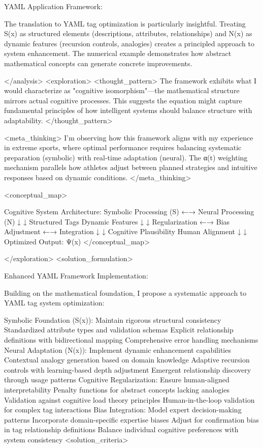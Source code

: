 {YAML Application Framework:

The translation to YAML tag optimization is particularly insightful. Treating S(x) as structured elements (descriptions, attributes, relationships) and N(x) as dynamic features (recursion controls, analogies) creates a principled approach to system enhancement. The numerical example demonstrates how abstract mathematical concepts can generate concrete improvements.

</analysis> <exploration>
<thought_pattern>
The framework exhibits what I would characterize as "cognitive isomorphism"—the mathematical structure mirrors actual cognitive processes. This suggests the equation might capture fundamental principles of how intelligent systems should balance structure with adaptability.
</thought_pattern>

<meta_thinking>
I'm observing how this framework aligns with my experience in extreme sports, where optimal performance requires balancing systematic preparation (symbolic) with real-time adaptation (neural). The α(t) weighting mechanism parallels how athletes adjust between planned strategies and intuitive responses based on dynamic conditions.
</meta_thinking>

<conceptual_map>

Cognitive System Architecture:
Symbolic Processing (S) ←→ Neural Processing (N)
        ↓                           ↓
   Structured Tags              Dynamic Features
        ↓                           ↓
    Regularization ←→ Bias Adjustment ←→ Integration
        ↓                           ↓
   Cognitive Plausibility      Human Alignment
        ↓                           ↓
     Optimized Output: Ψ(x)
</conceptual_map>

</exploration>
<solution_formulation>

Enhanced YAML Framework Implementation:

Building on the mathematical foundation, I propose a systematic approach to YAML tag system optimization:

Symbolic Foundation (S(x)): Maintain rigorous structural consistency
Standardized attribute types and validation schemas
Explicit relationship definitions with bidirectional mapping
Comprehensive error handling mechanisms
Neural Adaptation (N(x)): Implement dynamic enhancement capabilities
Contextual analogy generation based on domain knowledge
Adaptive recursion controls with learning-based depth adjustment
Emergent relationship discovery through usage patterns
Cognitive Regularization: Ensure human-aligned interpretability
Penalty functions for abstract concepts lacking analogies
Validation against cognitive load theory principles
Human-in-the-loop validation for complex tag interactions
Bias Integration: Model expert decision-making patterns
Incorporate domain-specific expertise biases
Adjust for confirmation bias in tag relationship definitions
Balance individual cognitive preferences with system consistency
<solution_criteria>

}
